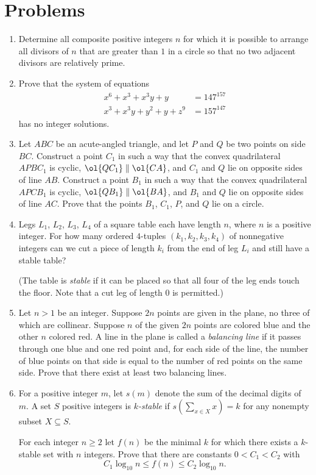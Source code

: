 \documentclass[11pt]{scrartcl}
\begin{document}
\section{Problems}
\begin{enumerate}[\bfseries 1.]
\item %
Determine all composite positive integers $n$ for which
it is possible to arrange all divisors of $n$ that are greater than $1$
in a circle so that no two adjacent divisors are relatively prime.

\item %
Prove that the system of equations
\begin{align*}
  x^6 + x^3 + x^3y + y &= 147^{157} \\
  x^3 + x^3y + y^2 + y + z^9 &= 157^{147}
\end{align*}
has no integer solutions.

\item %
Let $ABC$ be an acute-angled triangle,
and let $P$ and $Q$ be two points on side $BC$.
Construct a point $C_1$
in such a way that the convex quadrilateral
$APBC_1$ is cyclic,
$\ol{QC_1} \parallel \ol{CA}$,
and $C_1$ and $Q$ lie on opposite sides of line $AB$.
Construct a point $B_1$ in such a way that the
convex quadrilateral $APCB_1$ is cyclic,
$\ol{QB_1} \parallel \ol{BA}$,
and $B_1$ and $Q$ lie on opposite sides of line $AC$.
Prove that the points $B_1$, $C_1$, $P$, and $Q$ lie on a circle.

\item %
Legs $L_1$, $L_2$, $L_3$, $L_4$ of a square table each have length $n$,
where $n$ is a positive integer.
For how many ordered $4$-tuples $(k_1, k_2, k_3, k_4)$ of nonnegative integers
can we cut a piece of length $k_i$ from the end of leg $L_i$
and still have a stable table?

(The table is \emph{stable} if it can be placed
so that all four of the leg ends touch the floor.
Note that a cut leg of length $0$ is permitted.)

\item %
Let $n > 1$ be an integer.
Suppose $2n$ points are given in the plane,
no three of which are collinear.
Suppose $n$ of the given $2n$ points are colored blue
and the other $n$ colored red.
A line in the plane is called a \emph{balancing line}
if it passes through one blue and one red point
and, for each side of the line, the number of blue points on that
side is equal to the number of red points on the same side.
Prove that there exist at least two balancing lines.

\item %
For a positive integer $m$,
let $s(m)$ denote the sum of the decimal digits of $m$.
A set $S$ positive integers is \emph{$k$-stable}
if $s(\sum_{x \in X} x) = k$ for any nonempty subset $X \subseteq S$.

For each integer $n \ge 2$ let $f(n)$ be the minimal $k$
for which there exists a $k$-stable set with $n$ integers.
Prove that there are constants $0 < C_1 < C_2$ with
\[ C_1 \log_{10} n \le f(n) \le C_2 \log_{10} n. \]

\end{enumerate}
\pagebreak
\end{document}
